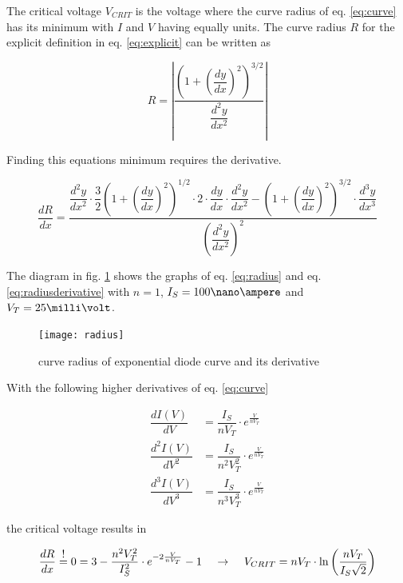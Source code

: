 The critical voltage $V_{CRIT}$ is the voltage where the curve radius
of eq. \eqref{eq:curve} has its minimum with $I$ and $V$ having
equally units.  The curve radius $R$ for the explicit definition in
eq. \eqref{eq:explicit} can be written as

\begin{equation}
R = \left|\dfrac{\left(1+\left(\dfrac{dy}{dx}\right)^{2}\right)^{3/2}}{\dfrac{d^{2}y}{dx^{2}}}\right|
\label{eq:radius}
\end{equation}

Finding this equations minimum requires the derivative.

\begin{equation}
\dfrac{dR}{dx} = \dfrac{\dfrac{d^{2}y}{dx^{2}} \cdot \dfrac{3}{2}\left(1+\left(\dfrac{dy}{dx}\right)^{2}\right)^{1/2} \cdot 2 \cdot \dfrac{dy}{dx} \cdot \dfrac{d^{2}y}{dx^{2}} - \left(1+\left(\dfrac{dy}{dx}\right)^{2}\right)^{3/2} \cdot \dfrac{d^{3}y}{dx^{3}}}{\left(\dfrac{d^{2}y}{dx^{2}}\right)^{2}}
\label{eq:radiusderivative}
\end{equation}

The diagram in fig. \ref{fig:radius} shows the graphs of
eq. \eqref{eq:radius} and eq. \eqref{eq:radiusderivative} with $n=1$,
$I_{S}=100\nano\ampere$ and $V_{T}=25\milli\volt$.

\begin{figure}[ht]
\begin{center}
\texttt{[image: radius]}
\end{center}
\caption{curve radius of exponential diode curve and its derivative}
\label{fig:radius}
\end{figure}
\FloatBarrier

With the following higher derivatives of eq. \eqref{eq:curve}

\begin{align}
\dfrac{d I\left(V\right)}{dV} &= \dfrac{I_{S}}{n V_{T}}\cdot e^{\frac{V}{n V_{T}}}\\
\dfrac{d^{2} I\left(V\right)}{dV^{2}} &= \dfrac{I_{S}}{n^{2} V_{T}^{2}}\cdot e^{\frac{V}{n V_{T}}}\\
\dfrac{d^{3} I\left(V\right)}{dV^{3}} &= \dfrac{I_{S}}{n^{3} V_{T}^{3}}\cdot e^{\frac{V}{n V_{T}}}
\end{align}

the critical voltage results in

\begin{equation}
\dfrac{dR}{dx} \;\shortstack{!\\=}\; 0 = 3 - \dfrac{n^{2} V_{T}^{2}}{I_{S}^{2}}\cdot e^{-2\frac{V}{n V_{T}}} - 1
\;\;\;\; \rightarrow \;\;\;\;
V_{CRIT} = n V_{T}\cdot \ln{\left(\dfrac{n V_{T}}{I_{S} \sqrt{2}}\right)}
\end{equation}


